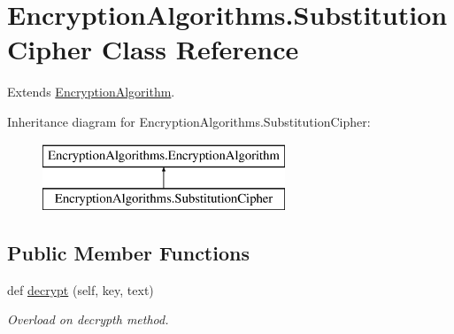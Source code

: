 \hypertarget{classEncryptionAlgorithms_1_1SubstitutionCipher}{}\section{Encryption\+Algorithms.\+Substitution\+Cipher Class Reference}
\label{classEncryptionAlgorithms_1_1SubstitutionCipher}


Extends \mbox{\hyperlink{classEncryptionAlgorithms_1_1EncryptionAlgorithm}{Encryption\+Algorithm}}.  


Inheritance diagram for Encryption\+Algorithms.\+Substitution\+Cipher\+:\begin{figure}[H]
\begin{center}
\leavevmode
\includegraphics[height=2.000000cm]{classEncryptionAlgorithms_1_1SubstitutionCipher}
\end{center}
\end{figure}
\subsection*{Public Member Functions}
\begin{DoxyCompactItemize}
\item 
def \mbox{\hyperlink{classEncryptionAlgorithms_1_1SubstitutionCipher_ac8d0e10409c6dd0ac7cbb7bf94f4f2bd}{decrypt}} (self, key, text)
\begin{DoxyCompactList}\small\item\em Overload on decrypth method. \end{DoxyCompactList}\end{DoxyCompactItemize}
